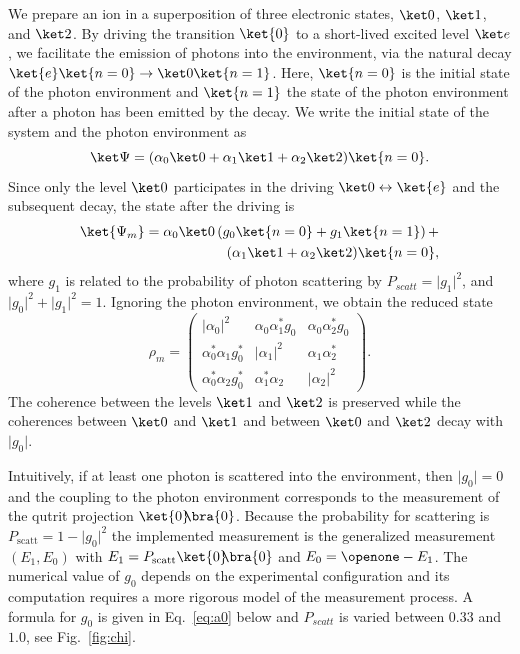 \documentclass[
aps,prl,
reprint,
a4paper,
superscriptaddress,
floatfix,
]{revtex4-1}
\newcommand{\abs}[1]{{\lvert{#1}\rvert}}
\newcommand{\ketbra}[2]{{\ket{#1}\!\!\bra{#2}}}
\newcommand{\proj}[1]{{\ketbra{#1}{#1}}}
\begin{document}
We prepare an ion in a superposition of three electronic states, 
 $\ket0$, $\ket1$, and $\ket2$.
By driving the transition $\ket{0}$ to a short-lived 
 excited level $\ket e$, we facilitate the emission of photons into the 
 environment, via the natural decay $\ket{e}\ket{n=0}\rightarrow \ket 
 0\ket{n=1}$.
Here, $\ket{n=0}$ is the initial state of the photon environment and 
 $\ket{n=1}$ the state of the photon environment after a photon 
 has been emitted by the decay.
We write the initial state of the system and the photon environment as
%
\begin{equation}
 \ket\Psi= (\alpha_0\ket0+ \alpha_1\ket1+ \alpha_2\ket2) \ket{n=0}.
\end{equation}
%
Since only the level $\ket0$ participates in the driving $\ket0\leftrightarrow 
 \ket{e}$ and the subsequent decay, the state after the driving is
%
\begin{equation}\begin{split}
 \ket{\Psi_m}= \alpha_0\ket0 \left( g_0\ket{n=0} + g_1 
 \ket{n=1}\right)+ \\
 (\alpha_1\ket1+ \alpha_2\ket2) \ket{n=0},
\end{split}\end{equation}
%
where $g_1$ is related to the probability of photon scattering by $P_{scatt} = \abs{g_1}^2$, and $\abs{g_0}^2 + \abs{g_1}^2 = 1$. 
Ignoring the photon environment, we obtain the reduced state
%
\begin{equation}
 \rho_m=
 \begin{pmatrix}
  \abs{\alpha_0}^2 & \alpha_0 \alpha_1^* g_0 & \alpha_0 \alpha_2^* g_0 \\
  \alpha_0^* \alpha_1 g_0^* & \abs{\alpha_1}^2 & \alpha_1 \alpha_2^* \\
  \alpha_0^*\alpha_2 g_0^* & \alpha_1^* \alpha_2 & \abs{\alpha_2}^2
 \end{pmatrix}.
\end{equation}
%
The coherence between the levels $\ket1$ and $\ket2$ is preserved while the 
 coherences between $\ket0$ and $\ket1$ and between $\ket0$ and $\ket2$ decay with 
 $\abs{g_0}$.

Intuitively, if at least one photon is scattered into the environment, then 
 $\abs{g_0}= 0$ and the coupling to the photon environment corresponds to the measurement 
 of the qutrit projection $\proj 0$.
Because the probability for scattering is $P_\mathrm{scatt}= 1-\abs{g_0}^2$ 
 the implemented measurement is the generalized measurement $(E_1,E_0)$ with 
 $E_1= P_\mathrm{scatt} \proj0$ and $E_0= \openone-E_1$.
The numerical value of $g_0$ depends on the experimental configuration and its 
 computation requires a more rigorous model of the measurement process.
A formula for $g_0$ is given in Eq.~\eqref{eq:a0} below and 
 $P_{scatt}$ is varied between $0.33$ and $1.0$, see Fig.~\ref{fig:chi}.
\end{document}
